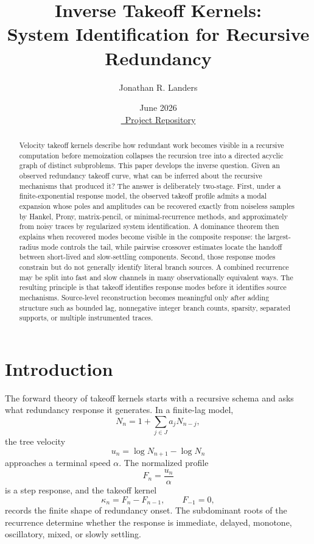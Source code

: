 \documentclass[10pt,twocolumn]{article}
\title{\vspace{-1.0em}Inverse Takeoff Kernels:\\
System Identification for Recursive Redundancy}
\author{Jonathan R. Landers}
\date{June 2026\\[0.25em]
\href{https://github.com/jonland82/finite-response-kernels}{\faGithub\ Project Repository}}
\begin{document}
\maketitle
\vspace{-1.4em}

\begin{abstract}
Velocity takeoff kernels describe how redundant work becomes visible in a
recursive computation before memoization collapses the recursion tree into a
directed acyclic graph of distinct subproblems. This paper develops the inverse
question. Given an observed redundancy takeoff curve, what can be inferred
about the recursive mechanisms that produced it? The answer is deliberately
two-stage. First, under a finite-exponential response model, the observed
takeoff profile admits a modal expansion whose poles and amplitudes can be
recovered exactly from noiseless samples by Hankel, Prony, matrix-pencil, or
minimal-recurrence methods, and approximately from noisy traces by regularized
system identification. A dominance theorem then explains when recovered modes
become visible in the composite response: the largest-radius mode controls the
tail, while pairwise crossover estimates locate the handoff between short-lived
and slow-settling components. Second, those response modes constrain but do not
generally identify literal branch sources. A combined recurrence may be split
into fast and slow channels in many observationally equivalent ways. The
resulting principle is that takeoff identifies response modes before it
identifies source mechanisms. Source-level reconstruction becomes meaningful
only after adding structure such as bounded lag, nonnegative integer branch
counts, sparsity, separated supports, or multiple instrumented traces.
\end{abstract}

\section{Introduction}

The forward theory of takeoff kernels starts with a recursive schema and asks
what redundancy response it generates. In a finite-lag model,
\[
        N_n = 1+\sum_{j\in J} a_j N_{n-j},
\]
the tree velocity
\[
        u_n=\log N_{n+1}-\log N_n
\]
approaches a terminal speed \(\alpha\). The normalized profile
\[
        F_n=\frac{u_n}{\alpha}
\]
is a step response, and the takeoff kernel
\[
        \kappa_n=F_n-F_{n-1}, \qquad F_{-1}=0,
\]
records the finite shape of redundancy onset. The subdominant roots of the
recurrence determine whether the response is immediate, delayed, monotone,
oscillatory, mixed, or slowly settling.
\end{document}
